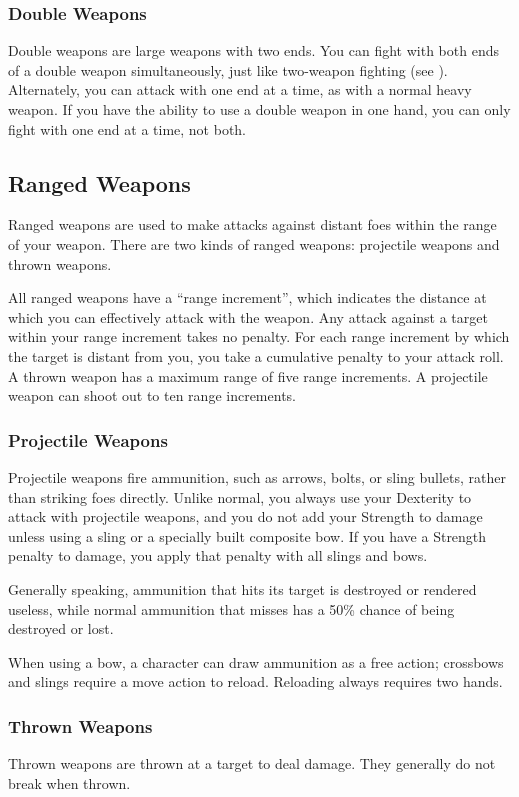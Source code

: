 \subsubsection{Double Weapons}
Double weapons are large weapons with two ends. You can fight with both ends of a double weapon simultaneously, just like two-weapon fighting (see ). Alternately, you can attack with one end at a time, as with a normal heavy weapon. If you have the ability to use a double weapon in one hand, you can only fight with one end at a time, not both. 

\subsection{Ranged Weapons}
Ranged weapons are used to make attacks against distant foes within the range of your weapon. There are two kinds of ranged weapons: projectile weapons and thrown weapons.

 All ranged weapons have a ``range increment'', which indicates the distance at which you can effectively attack with the weapon. Any attack against a target within your range increment takes no penalty. For each range increment by which the target is distant from you, you take a cumulative  penalty to your attack roll. A thrown weapon has a maximum range of five range increments. A projectile weapon can shoot out to ten range increments.

\subsubsection{Projectile Weapons} Projectile weapons fire ammunition, such as arrows, bolts, or sling bullets, rather than striking foes directly. Unlike normal, you always use your Dexterity to attack with projectile weapons, and you do not add your Strength to damage unless using a sling or a specially built composite bow. If you have a Strength penalty to damage, you apply that penalty with all slings and bows.

 Generally speaking, ammunition that hits its target is destroyed or rendered useless, while normal ammunition that misses has a 50\% chance of being destroyed or lost.

 When using a bow, a character can draw ammunition as a free action; crossbows and slings require a move action to reload. Reloading always requires two hands.

\subsubsection{Thrown Weapons} Thrown weapons are thrown at a target to deal damage. They generally do not break when thrown.

